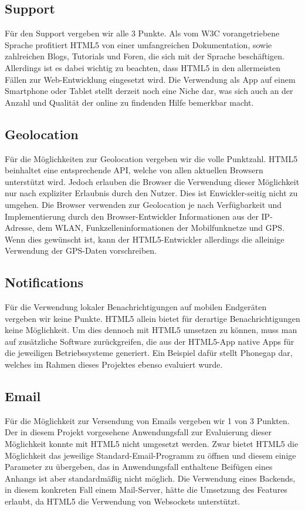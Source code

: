 \subsection{Support}
Für den Support vergeben wir alle 3 Punkte. Als vom W3C vorangetriebene Sprache profitiert HTML5 von einer umfangreichen Dokumentation, sowie zahlreichen Blogs, Tutorials und Foren, die sich mit der Sprache beschäftigen. Allerdings ist es dabei wichtig zu beachten, dass HTML5 in den allermeisten Fällen zur Web-Entwicklung eingesetzt wird. Die Verwendung als App auf einem Smartphone oder Tablet stellt derzeit noch eine Niche dar, was sich auch an der Anzahl und Qualität der online zu findenden Hilfe bemerkbar macht.

\subsection{Geolocation}
Für die Möglichkeiten zur Geolocation vergeben wir die volle Punktzahl. HTML5 beinhaltet eine entsprechende API, welche von allen aktuellen Browsern unterstützt wird. Jedoch erlauben die Browser die Verwendung dieser Möglichkeit nur nach expliziter Erlaubnis durch den Nutzer. Dies ist Enwickler-seitig nicht zu umgehen. Die Browser verwenden zur Geolocation je nach Verfügbarkeit und Implementierung durch den Browser-Entwickler Informationen aus der IP-Adresse, dem WLAN, Funkzelleninformationen der Mobilfunknetze und GPS. Wenn dies gewünscht ist, kann der HTML5-Entwickler allerdings die alleinige Verwendung der GPS-Daten vorschreiben.

\subsection{Notifications}
Für die Verwendung lokaler Benachrichtigungen auf mobilen Endgeräten vergeben wir keine Punkte. HTML5 allein bietet für derartige Benachrichtigungen keine Möglichkeit. Um dies dennoch mit HTML5 umsetzen zu können, muss man auf zusätzliche Software zurückgreifen, die aus der HTML5-App native Apps für die jeweiligen Betriebssysteme generiert. Ein Beispiel dafür stellt Phonegap dar, welches im Rahmen dieses Projektes ebenso evaluiert wurde.

\subsection{Email}
Für die Möglichkeit zur Versendung von Emails vergeben wir 1 von 3 Punkten. Der in diesem Projekt vorgesehene Anwendungsfall zur Evaluierung dieser Möglichkeit konnte mit HTML5 nicht umgesetzt werden. Zwar bietet HTML5 die Möglichkeit das jeweilige Standard-Email-Programm zu öffnen und diesem einige Parameter zu übergeben, das in Anwendungsfall enthaltene Beifügen eines Anhangs ist aber standardmäßig nicht möglich. Die Verwendung eines Backends, in diesem konkreten Fall einem Mail-Server, hätte die Umsetzung des Features erlaubt, da HTML5 die Verwendung von Websockets unterstützt.


